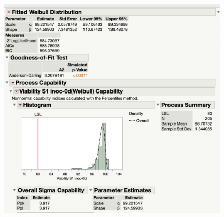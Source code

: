 \documentclass[11pt, oneside]{article}	%
\begin{document}
\begin{figure}[H]
\centering
\includegraphics[scale=0.35]{Anova Weibull JS1 seed Example.png}
\end{figure}
\end{document}

